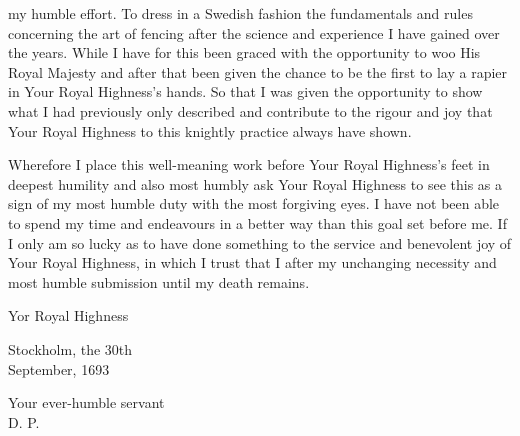 \newpage


\newpage


my humble effort.
To dress in a Swedish fashion the fundamentals and
rules concerning the art of fencing after the science and experience I
have gained over the years.
While I have for this been graced with the opportunity to woo His
Royal Majesty and after that been given the chance to be the first to
lay a rapier in Your Royal Highness's hands. So that I was given the
opportunity to show what I had previously only described and
contribute to the rigour and joy that Your Royal Highness to this
knightly practice always have shown.

Wherefore I place this well-meaning work before Your Royal Highness's
feet in deepest humility and also most humbly ask Your Royal Highness
to see this as a sign of my most humble duty with the most forgiving
eyes. I have not been able to spend my time and endeavours in a better
way than this goal set before me. If I only am so lucky as to have
done something to the service and benevolent joy of Your Royal
Highness, in which I trust that I after my unchanging necessity and
most humble submission until my death remains.

Yor Royal Highness

Stockholm, the 30th \\
September, 1693

Your ever-humble servant \\
D. P.


